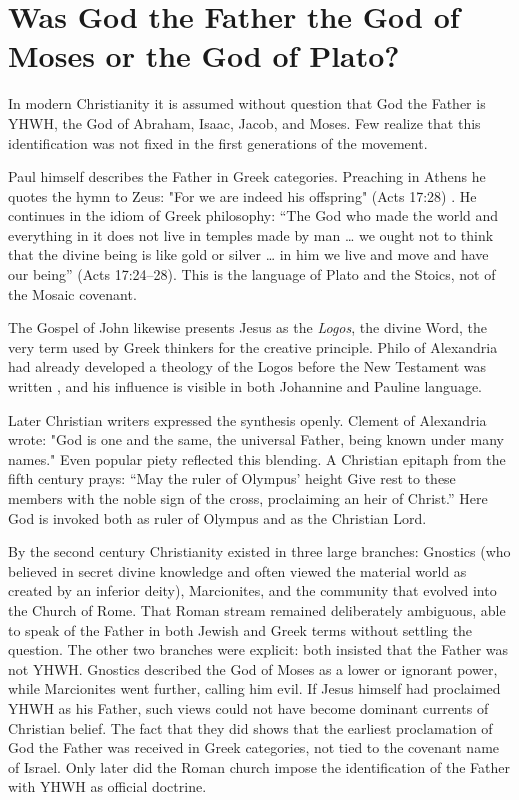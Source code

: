 \section{Was God the Father the God of Moses or the God of Plato?}\label{sec:was-god-the-father-the-god-of-moses-or-the-god-of-plato}

In modern Christianity it is assumed without question that God the Father is YHWH, the God of Abraham, Isaac, Jacob, and Moses.
Few realize that this identification was not fixed in the first generations of the movement.

Paul himself describes the Father in Greek categories.
Preaching in Athens he quotes the hymn to Zeus: "For we are indeed his offspring" (Acts 17:28) \cite[5]{aratus:phaenomena}.
He continues in the idiom of Greek philosophy: “The God who made the world and everything in it does not live in temples made by man … we ought not to think that the divine being is like gold or silver … in him we live and move and have our being” (Acts 17:24--28).
This is the language of Plato and the Stoics, not of the Mosaic covenant.

The Gospel of John likewise presents Jesus as the \emph{Logos}, the divine Word, the very term used by Greek thinkers for the creative principle.
Philo of Alexandria had already developed a theology of the Logos before the New Testament was written \cite{philo:opificio}, and his influence is visible in both Johannine and Pauline language.

Later Christian writers expressed the synthesis openly.
Clement of Alexandria \cite[5.12]{clement:stromata} wrote: "God is one and the same, the universal Father, being known under many names."
Even popular piety reflected this blending.
A Christian epitaph from the fifth century prays:
“May the ruler of Olympus’ height
Give rest to these members with the noble sign of the cross,
proclaiming an heir of Christ.”
Here God is invoked both as ruler of Olympus and as the Christian Lord.

By the second century Christianity existed in three large branches: Gnostics (who believed in secret divine knowledge and often viewed the material world as created by an inferior deity), Marcionites, and the community that evolved into the Church of Rome.
That Roman stream remained deliberately ambiguous, able to speak of the Father in both Jewish and Greek terms without settling the question.
The other two branches were explicit: both insisted that the Father was not YHWH.
Gnostics described the God of Moses as a lower or ignorant power, while Marcionites went further, calling him evil.
If Jesus himself had proclaimed YHWH as his Father, such views could not have become dominant currents of Christian belief.
The fact that they did shows that the earliest proclamation of God the Father was received in Greek categories, not tied to the covenant name of Israel.
Only later did the Roman church impose the identification of the Father with YHWH as official doctrine.

